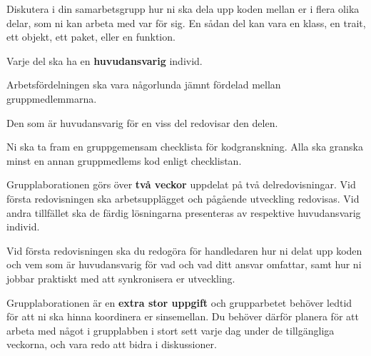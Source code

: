 \item
Diskutera i din samarbetsgrupp hur ni ska dela upp koden mellan er i flera olika delar, som ni kan arbeta med var för sig. En sådan del kan vara en klass, en trait, ett objekt, ett paket, eller en funktion.
\item
Varje del ska ha en \textbf{huvudansvarig} individ.
\item
Arbetsfördelningen ska vara någorlunda jämnt fördelad mellan gruppmedlemmarna.
\item
Den som är huvudansvarig för en viss del redovisar den delen.
\item 
Ni ska ta fram en gruppgemensam checklista för kodgranskning. Alla ska granska minst en annan gruppmedlems kod enligt checklistan. 
\item
Grupplaborationen görs över \textbf{två veckor} uppdelat på två delredovisningar. Vid första redovisningen ska arbetsupplägget och pågående utveckling redovisas. Vid andra tillfället ska de färdig lösningarna presenteras av respektive huvudansvarig individ.
\item
Vid första redovisningen ska du redogöra för handledaren hur ni delat upp koden och vem som är huvudansvarig för vad och vad ditt ansvar omfattar, samt hur ni jobbar praktiskt med att synkronisera er utveckling.
\item Grupplaborationen är en \textbf{extra stor uppgift} och grupparbetet behöver ledtid för att ni ska hinna koordinera er sinsemellan. Du behöver därför planera för att arbeta med något i grupplabben i stort sett varje dag under de tillgängliga veckorna, och vara redo att bidra i diskussioner.
